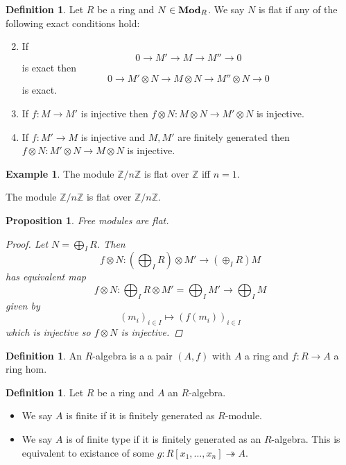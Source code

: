 \documentclass{article}
\newcommand{\Z}{\mathbb{Z}}
\DeclareMathOperator{\modules}{{\bf Mod}}
\newtheorem{proposition}[theorem]{Proposition}
\theoremstyle{definition}
\newtheorem{definition}[theorem]{Definition}
\newtheorem{example}[theorem]{Example}
\begin{document}
\begin{definition}
    Let \(R\) be a ring and \(N\in\modules_{R}\). We say \(N\) is flat if any of the following exact conditions hold:
    \begin{enumerate}[i]
        \setcounter{enumi}{1}
        \item If
              \[
                  0\to M'\to M\to M''\to 0
              \]
              is exact then
              \[
                  0\to M'\otimes N\to M\otimes N\to M''\otimes N\to 0
              \]
              is exact.

        \item If \(f:M\to M'\) is injective then \(f\otimes N:M\otimes N\to
              M'\otimes N\) is injective.

        \item If \(f:M'\to M\) is injective and \(M,M'\) are finitely generated
              then \(f\otimes N:M'\otimes N\to M\otimes N\) is injective.
    \end{enumerate}
\end{definition}

\begin{example}
    The module \(\Z/n\Z\) is flat over \(\Z\) iff \(n=1\).

    The module \(\Z/n\Z\) is flat over \(\Z/n\Z\).
\end{example}

\begin{proposition}
    Free modules are flat.

    \begin{proof}
        Let \(N=\bigoplus_{I}R\). Then
        \[
            f\otimes N:(\bigoplus_{I}R)\otimes M'\to (\oplus_{I}R)M
        \]
        has equivalent map
        \[
            f\otimes N:\bigoplus_{I} R\otimes M'=\bigoplus_{I}M'\to \bigoplus_{I}M
        \]
        given by
        \[
            (m_{i})_{i\in I}\mapsto (f(m_{i}))_{i\in I}
        \]
        which is injective so \(f\otimes N\) is injective.
    \end{proof}
\end{proposition}

\begin{definition}
    An \(R\)-algebra is a a pair \((A,f)\) with \(A\) a ring and \(f:R\to A\) a
    ring hom.
\end{definition}

\begin{definition}
    Let \(R\) be a ring and \(A\) an \(R\)-algebra.
    \begin{itemize}
        \item We say \(A\) is finite if it is finitely generated as
              \(R\)-module.

        \item We say \(A\) is of finite type if it is finitely generated as an
              \(R\)-algebra. This is equivalent to existance of some
              \(g:R[x_{1},\ldots,x_{n}]\twoheadrightarrow A\).
    \end{itemize}
\end{definition}
\end{document}

